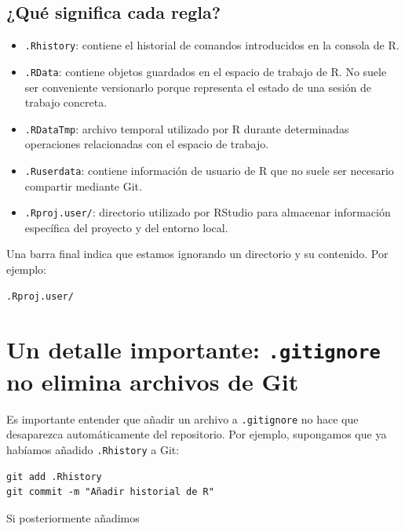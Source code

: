 \documentclass[11pt,a4paper]{article}
\theoremstyle{exercise}
\begin{document}
\subsection{¿Qué significa cada regla?}

\begin{itemize}
    \item \texttt{.Rhistory}: contiene el historial de comandos introducidos en la consola de R.
    
    \item \texttt{.RData}: contiene objetos guardados en el espacio de trabajo de R. No suele ser conveniente versionarlo porque representa el estado de una sesión de trabajo concreta.
    
    \item \texttt{.RDataTmp}: archivo temporal utilizado por R durante determinadas operaciones relacionadas con el espacio de trabajo.
    
    \item \texttt{.Ruserdata}: contiene información de usuario de R que no suele ser necesario compartir mediante Git.
    
    \item \texttt{.Rproj.user/}: directorio utilizado por RStudio para almacenar información específica del proyecto y del entorno local.
\end{itemize}

\noindent Una barra final indica que estamos ignorando un directorio y su contenido. Por ejemplo:
\begin{lstlisting}[style=mdstyle]
.Rproj.user/
\end{lstlisting}



\section{Un detalle importante: \texttt{.gitignore} no elimina archivos de Git}

Es importante entender que añadir un archivo a \texttt{.gitignore} no hace que desaparezca automáticamente del repositorio. Por ejemplo, supongamos que ya habíamos añadido \texttt{.Rhistory} a Git:

\medskip

\begin{lstlisting}[style=mdstyle]
git add .Rhistory
git commit -m "Añadir historial de R"
\end{lstlisting}

\noindent Si posteriormente añadimos
\end{document}

